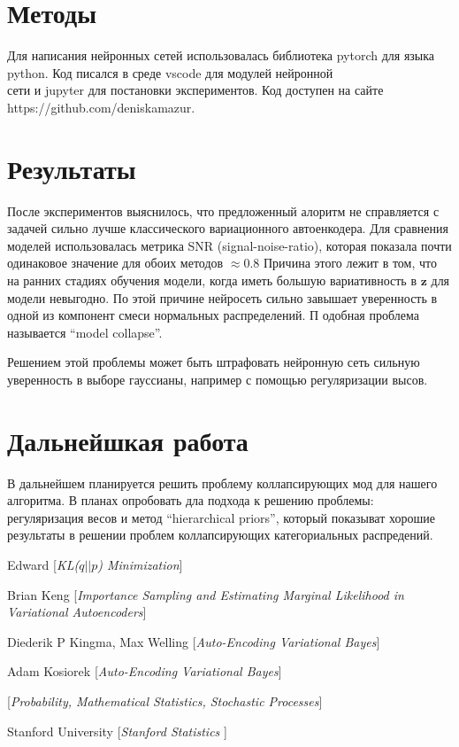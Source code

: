 \documentclass[a4paper]{report}
\begin{document}
\section{Методы}
Для написания нейронных сетей использовалась библиотека pytorch для языка python. Код писался в среде vscode для модулей нейронной\\ 
сети и jupyter для постановки экспериментов. Код доступен на сайте\\
https://github.com/deniskamazur.

\section{Результаты}

После экспериментов выяснилось, что предложенный алоритм не справляется с задачей сильно лучше классического вариационного автоенкодера.
Для сравнения моделей использовалась метрика SNR (signal-noise-ratio), которая показала почти одинаковое значение для обоих методов $\approx 0.8$ 
Причина этого лежит в том, что на ранних стадиях обучения модели, когда иметь большую вариативность в $\mathbf{z}$ для модели невыгодно. 
По этой причине нейросеть сильно завышает уверенность в одной из компонент смеси нормальных распределений. П
одобная проблема называется ``model collapse''.

Решением этой проблемы может быть штрафовать нейронную сеть сильную уверенность в выборе гауссианы, например с помощью регуляризации высов.

\section{Дальнейшкая работа}

В дальнейшем планируется решить проблему коллапсирующих мод для нашего алгоритма. В планах опробовать дла подхода к решению проблемы:
регуляризация весов и метод ``hierarchical priors'', который показыват хорошие результаты в решении проблем коллапсирующих категориальных распредений.

\newpage
\begin{thebibliography}{9}

Edward 
[\textit{KL($q || p$) Minimization}]

Brian Keng
[\textit{Importance Sampling and Estimating Marginal Likelihood in Variational Autoencoders}] 

Diederik P Kingma, Max Welling
[\textit{Auto-Encoding Variational Bayes}] 

Adam Kosiorek
[\textit{Auto-Encoding Variational Bayes}] 

[\textit{Probability, Mathematical Statistics, Stochastic Processes}] 

Stanford University
[\textit{Stanford Statistics }] 



\end{thebibliography}
\end{document}
